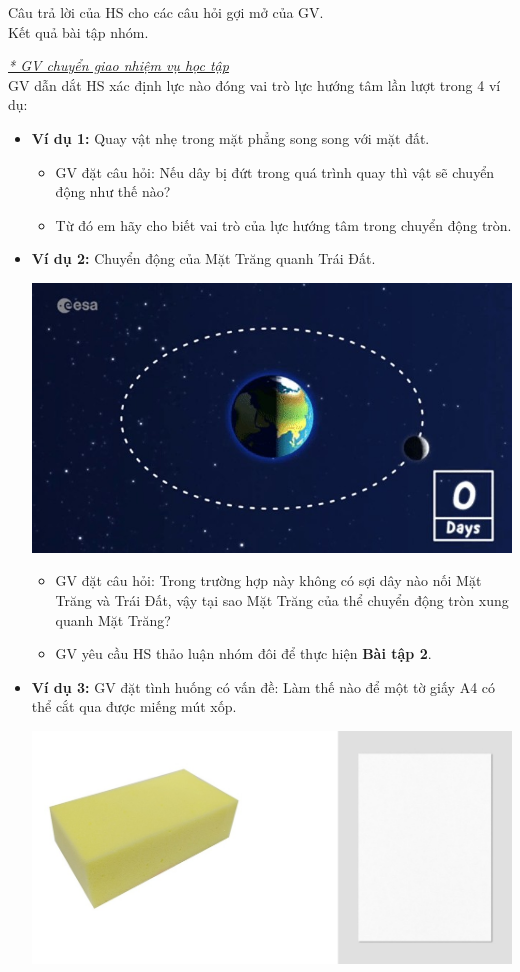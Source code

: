 {Câu trả lời của HS cho các câu hỏi gợi mở của GV.\\
	Kết quả bài tập nhóm.

}
{\textit{\underline{* GV chuyển giao nhiệm vụ học tập}}\\
	GV dẫn dắt HS xác định lực nào đóng vai trò lực hướng tâm lần lượt trong 4 ví dụ:
	\begin{itemize}
		\item \textbf{Ví dụ 1:} Quay vật nhẹ trong mặt phẳng song song với mặt đất.
		\begin{itemize}
			\item GV đặt câu hỏi: Nếu dây bị đứt trong quá trình quay thì vật sẽ chuyển động như thế nào?
			\item Từ đó em hãy cho biết vai trò của lực hướng tâm trong chuyển động tròn.
		\end{itemize}
		\item \textbf{Ví dụ 2:} Chuyển động của Mặt Trăng quanh Trái Đất.
		\begin{center}
			\includegraphics[scale=0.5]{figs/G10-BAI21-3}
		\end{center}
		\begin{itemize}
			\item GV đặt câu hỏi: Trong trường hợp này không có sợi dây nào nối Mặt Trăng và Trái Đất, vậy tại sao Mặt Trăng của thể chuyển động tròn xung quanh Mặt Trăng?
			\item GV yêu cầu HS thảo luận nhóm đôi để thực hiện \textbf{Bài tập 2}.
		\end{itemize}
		\item \textbf{Ví dụ 3:} GV đặt tình huống có vấn đề: Làm thế nào để một tờ giấy A4 có thể cắt qua được miếng mút xốp.
		\begin{center}
			\includegraphics[scale=0.5]{figs/G10-BAI21-4}

\end{center}
\end{itemize}}
